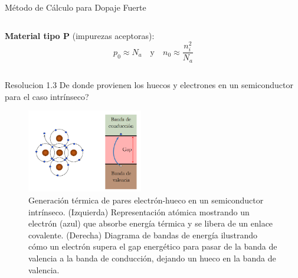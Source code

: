 \documentclass[
    10pt,
    aspectratio=169,
    xcolor={dvipsnames},
    spanish,
    ]{beamer}
\begin{document}
\begin{frame}
\begin{block}{Método de Cálculo para Dopaje Fuerte}
\begin{columns}
      \begin{column}{0.48\textwidth}
        \textbf{Material tipo P} (impurezas aceptoras):
        \begin{equation}
          p_0 \approx N_a \quad \text{y} \quad n_0 \approx \frac{n_i^2}{N_a}
        \end{equation}
      \end{column}
    \end{columns}
  \end{block}
\end{frame}
\begin{frame}
  \begin{block}{Resolucion 1.3}
    De donde provienen los huecos y electrones en un semiconductor para el caso intrínseco?
  \end{block}
    \begin{figure}
    \centering
    \includegraphics[width=0.45\textwidth]{../figures/Auxiliar_2_4.png}
    \caption{Generación térmica de pares electrón-hueco en un semiconductor intrínseco. (Izquierda) Representación atómica mostrando un electrón (azul) que absorbe energía térmica y se libera de un enlace covalente. (Derecha) Diagrama de bandas de energía ilustrando cómo un electrón supera el gap energético para pasar de la banda de valencia a la banda de conducción, dejando un hueco en la banda de valencia.}
  \end{figure}
\end{frame}
\end{document}
